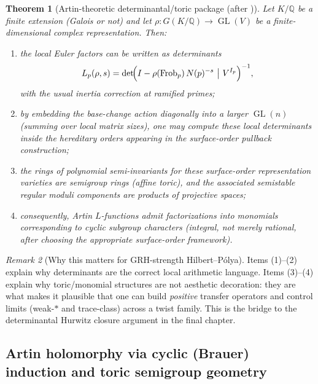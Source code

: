 \documentclass[11pt,oneside]{amsbook}
\numberwithin{equation}{section}
\theoremstyle{plain}
\newtheorem{theorem}{Theorem}[section]
\theoremstyle{definition}
\theoremstyle{remark}
\newtheorem{remark}[theorem]{Remark}
\newcommand{\Q}{\mathbb{Q}}
\DeclareMathOperator{\GL}{\mathrm{GL}}
\begin{document}
\begin{theorem}[Artin-theoretic determinantal/toric package (after \cite{Schreiber2018SurfaceAlgebrasI})]
\label{thm:artin_determinantal_toric_package}
Let $K/\Q$ be a finite extension (Galois or not) and let $\rho:G(K/\Q)\to \GL(V)$ be a finite-dimensional complex representation.
Then:
\begin{enumerate}[label=(\arabic*)]
\item the local Euler factors can be written as determinants
\[
L_p(\rho,s)=\det\!\Bigl(I-\rho(\mathrm{Frob}_p)\,N(p)^{-s}\ \big|\ V^{I_p}\Bigr)^{-1},
\]
with the usual inertia correction at ramified primes;
\item by embedding the base-change action diagonally into a larger $\GL(n)$ (summing over local matrix sizes), one may compute these local determinants inside the hereditary orders appearing in the surface-order pullback construction;
\item the rings of polynomial semi-invariants for these surface-order representation varieties are semigroup rings (affine toric), and the associated semistable regular moduli components are products of projective spaces;
\item consequently, Artin $L$-functions admit factorizations into \emph{monomials} corresponding to cyclic subgroup characters (integral, not merely rational, after choosing the appropriate surface-order framework).
\end{enumerate}
\end{theorem}

\begin{remark}[Why this matters for GRH-strength Hilbert--Pólya]
Items (1)--(2) explain why determinants are the correct local arithmetic language.
Items (3)--(4) explain why toric/monomial structures are not aesthetic decoration:
they are what makes it plausible that one can build \emph{positive} transfer operators and control limits (weak-$\ast$ and trace-class) across a twist family.
This is the bridge to the determinantal Hurwitz closure argument in the final chapter.
\end{remark}


\subsection{Artin holomorphy via cyclic (Brauer) induction and toric semigroup geometry}
\label{sec:artin_holomorphy_semigroup_toric}
\end{document}
